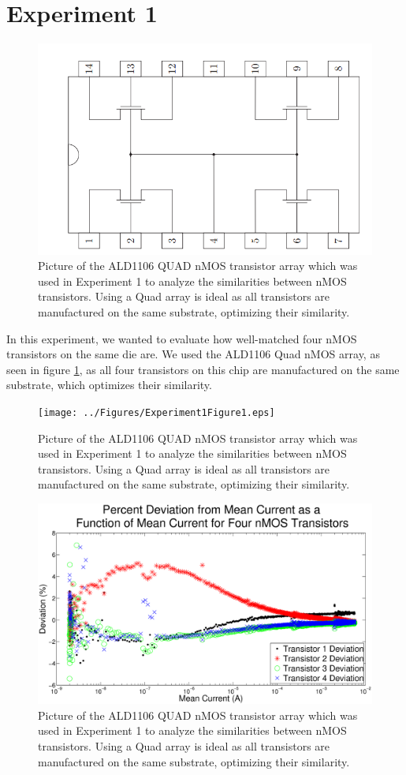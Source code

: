 \section*{Experiment 1}

\begin{figure}[H]
\centering
\includegraphics[width=0.65\linewidth]{../Figures/ald1106}
\caption{Picture of the ALD1106 QUAD nMOS transistor array which was used in Experiment 1 to analyze the similarities between nMOS transistors. Using a Quad array is ideal as all transistors are manufactured on the same substrate, optimizing their similarity.}
\label{fig:ald1106}
\end{figure}


In this experiment, we wanted to evaluate how well-matched four nMOS transistors on the same die are. We used the ALD1106 Quad nMOS array, as seen in figure \ref{fig:ald1106}, as all four transistors on this chip are manufactured on the same substrate, which optimizes their similarity.

\begin{figure}[H]
\centering
\texttt{[image: ../Figures/Experiment1Figure1.eps]}
\caption{Picture of the ALD1106 QUAD nMOS transistor array which was used in Experiment 1 to analyze the similarities between nMOS transistors. Using a Quad array is ideal as all transistors are manufactured on the same substrate, optimizing their similarity.}
\label{fig:exp1fig1}
\end{figure}
\begin{figure}[H]
\centering
\includegraphics[width=0.65\linewidth]{../Figures/Experiment1Figure2.eps}
\caption{Picture of the ALD1106 QUAD nMOS transistor array which was used in Experiment 1 to analyze the similarities between nMOS transistors. Using a Quad array is ideal as all transistors are manufactured on the same substrate, optimizing their similarity.}
\label{fig:exp1fig2}
\end{figure}